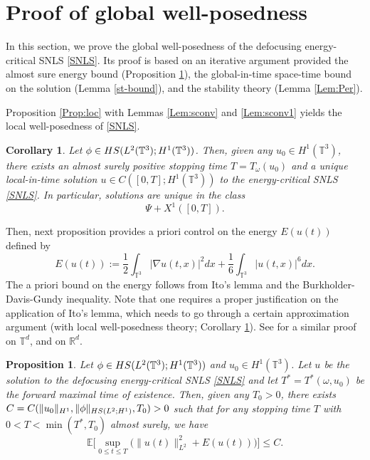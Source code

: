 \documentclass[letterpaper, 11pt,  reqno]{amsart}
\newtheorem{proposition}[theorem]{Proposition}
\newtheorem{corollary}[theorem]{Corollary}
\newcommand{\1}{\hspace{0.5mm}\text{I}\hspace{0.5mm}}
\newcommand{\R}{\mathbb{R}}
\newcommand{\T}{\mathbb{T}}
\newcommand{\nb}{\nabla}
\newcommand{\HS}{\textup{HS}}
\renewcommand{\o}{\omega}
\numberwithin{equation}{section}
\numberwithin{theorem}{section}
\begin{document}
\section{Proof of global well-posedness }
\label{SEC:Th}
In this section, we prove the global well-posedness of the defocusing energy-critical SNLS \eqref{SNLS}. 
Its proof is based on 
an iterative  argument provided 
the almost sure energy bound (Proposition \ref{Prop:as E}),
the global-in-time space-time bound on the solution (Lemma \ref{st-bound}),
and the stability theory (Lemma \ref{Lem:Per}).



Proposition \ref{Prop:loc} with
Lemmas \ref{Lem:sconv} and
\ref{Lem:sconv1}
yields
the local well-posedness of \eqref{SNLS}.



\begin{corollary}
\label{COR_LWP}
Let $\phi\in\HS(L^2(\T^3);H^1(\T^3))$. 
 Then, given any $u_0 \in H^1(\T^3)$, there exists an almost surely positive stopping time $T = T_\o(u_0)$
 and a unique local-in-time solution
$u \in C([0, T]; H^1(\T^3))$ to the energy-critical SNLS \eqref{SNLS}. 
In particular, solutions are unique in the class
 \[
 \Psi + X^1 ([0,T]).
 \]

\end{corollary}






Then, next proposition provides a priori control on the energy $E(u(t))$ defined by
\begin{equation}\label{energy}
   E(u(t)) := \frac 12 \int_{\T^3} |\nb u(t, x)|^2 dx
+ \frac{1}{6} \int_{\T^3} |u(t, x)|^6 dx.
\end{equation}
The a priori bound on the energy follows from Ito's lemma and the Burkholder-Davis-Gundy inequality. 
Note that one requires a proper  justification on  the application of Ito's lemma, 
which needs to go through a certain approximation argument (with  local well-posedness theory; Corollary \ref{COR_LWP}).
See \cite[Proposition 5.1]{CM18} for a similar proof on $\T^d$,
 and \cite{BD03, CL22, CLO21, OO20} on $\R^d$. 




\begin{proposition}\label{Prop:as E}
Let $\phi\in\HS(L^2(\T^3);H^1(\T^3))$ 
and $u_0\in H^1(\T^3)$. Let $u$
be the solution to the defocusing energy-critical SNLS \eqref{SNLS} and let $T^\ast=T^\ast(\omega,u_0)$ be the forward maximal time of existence. Then, given any $T_0>0$, there exists $C=C(\|u_0\|_{H^1},\|\phi\|_{\HS(L^2;H^1)},T_0)>0$ such that for any stopping time $T$ with $0<T<\min(T^\ast,T_0)$ almost surely, we have
\begin{equation*}
    \mathbb{E}
    \Big[\sup_{0\leq t\leq T}
    \big( \|u(t) \|_{L^2}^2 + E(u(t)) \big)
    \Big]
    \leq C.
\end{equation*}
\end{proposition}
\end{document}
